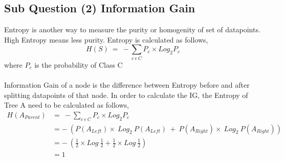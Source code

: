 \documentclass[a4paper,11pt]{article}
\newcommand\tab[1][1cm]{\hspace*{#1}}
\begin{document}
\begin{mlsolution}
\section{Sub Question (2)  Information Gain	}
\tab Entropy is another way to measure the purity or homogenity of set of datapoints. High Entropy means less purity. Entropy is calculated as follows,
$$H(S)\ =\ -\sum\limits_{c\  \epsilon\  C} {P_c \times Log_2 P_c}$$
\noindent
\tab \tab \tab \tab where $P_c$ is the probability of Class C\\\\
\noindent
\tab Information Gain of a node is the difference between Entropy before and after splitting datapoints of that node. In order to calculate the IG, the Entropy of Tree A need to be calculated as follows,
\begin{align*}
  H(A_{Parent}) &= \ -\sum\limits_{c\  \epsilon\  C} {P_c \times Log_2 P_c}\\
  &= -\ (P(A_{Left}) \times\ Log_2\ P(A_{Left})\ +\ P(A_{Right}) \times\ Log_2\ P(A_{Right}))\\
  &= -\ (\frac{1}{2} \times Log\ \frac{1}{2} + \frac{1}{2} \times Log\ \frac{1}{2} )\\
  &= 1
\end{align*}


\end{mlsolution}
\end{document}
